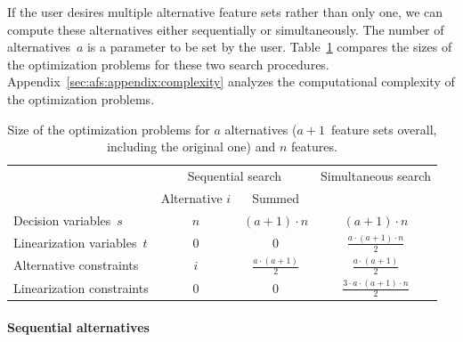 \documentclass{article}
\theoremstyle{definition}
\begin{document}
If the user desires multiple alternative feature sets rather than only one, we can compute these alternatives either sequentially or simultaneously.
The number of alternatives~$a$ is a parameter to be set by the user.
Table~\ref{tab:afs:seq-sim-comparison} compares the sizes of the optimization problems for these two search procedures.
Appendix~\ref{sec:afs:appendix:complexity} analyzes the computational complexity of the optimization problems.
%
\begin{table}[htb]
	\centering
	\renewcommand*{\arraystretch}{1.3}
	\begin{tabular}{lccc}
		\toprule
		& \multicolumn{2}{c}{Sequential search} & Simultaneous search \\
		\cmidrule(r){2-3}
		& Alternative $i$ & Summed & \\
		\midrule
		Decision variables~$s$ & $n$ & $ (a+1) \cdot n$ & $(a+1) \cdot n$ \\
		Linearization variables~$t$ & $0$ & $0$ & $\frac{a \cdot (a+1) \cdot n}{2}$ \\
		Alternative constraints & $i$ & $\frac{a \cdot (a+1)}{2}$ & $\frac{a \cdot (a+1)}{2}$ \\
		Linearization constraints & $0$ & $0$ & $\frac{3 \cdot a \cdot (a+1) \cdot n}{2}$ \\
		\bottomrule
	\end{tabular}
	\caption{Size of the optimization problems for $a$ alternatives ($a + 1$~feature sets overall, including the original one) and $n$ features.}
	\label{tab:afs:seq-sim-comparison}
\end{table}
%
\paragraph{Sequential alternatives}
\end{document}

